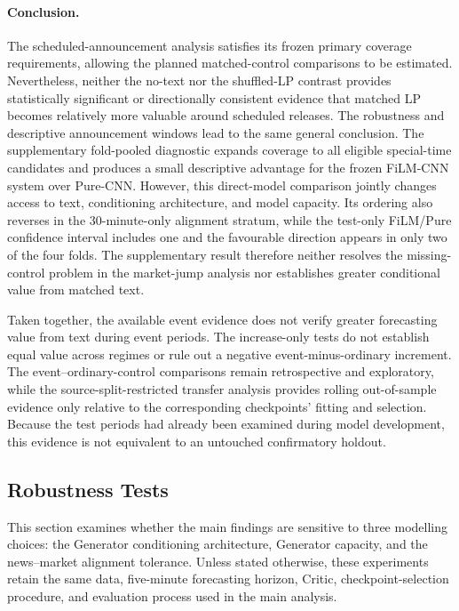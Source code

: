 \paragraph*{Conclusion.}
The scheduled-announcement analysis satisfies its frozen primary coverage
requirements, allowing the planned matched-control comparisons to be
estimated.  Nevertheless, neither the no-text nor the shuffled-LP contrast
provides statistically significant or directionally consistent evidence that
matched LP becomes relatively more valuable around scheduled releases.  The
robustness and descriptive announcement windows lead to the same general
conclusion.  The supplementary fold-pooled diagnostic expands
coverage to all eligible special-time candidates and produces a small
descriptive advantage for the frozen FiLM-CNN system over Pure-CNN.  However,
this direct-model comparison jointly changes access to text, conditioning
architecture, and model capacity.  Its ordering also reverses in the
30-minute-only alignment stratum, while the test-only FiLM/Pure confidence
interval includes one and the favourable direction appears in only two of the
four folds.  The supplementary result therefore neither resolves the missing-
control problem in the market-jump analysis nor establishes greater
conditional value from matched text.

Taken together, the available event evidence does not verify greater
forecasting value from text during event periods.  The increase-only tests
do not establish equal value across regimes or rule out a negative
event-minus-ordinary increment.  The event--ordinary-control comparisons remain retrospective and
exploratory, while the source-split-restricted transfer analysis provides
rolling out-of-sample evidence only relative to the corresponding
checkpoints' fitting and selection.  Because the test periods had already been
examined during model development, this evidence is not equivalent to an
untouched confirmatory holdout.





\subsection*{Robustness Tests}

This section examines whether the main findings are sensitive to three modelling choices: the Generator conditioning architecture, Generator capacity, and the news--market alignment tolerance. Unless stated otherwise, these experiments retain the same data, five-minute forecasting horizon, Critic, checkpoint-selection procedure, and evaluation process used in the main analysis.


